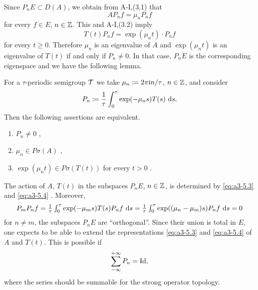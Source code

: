 Since $P_{n}E \subset D(A)$, we obtain from A-I,(3.1) that
\begin{equation}\label{eq:a3-5.3}
AP_{n}f = \mu_{n}P_{n}f
\end{equation}
for every $f \in E$, $n \in \mathbb{Z}$.
This and A-I,(3.2) imply
\begin{equation}\label{eq:a3-5.4}
T(t)P_{n}f = \exp(\mu_{n}t) \cdot P_{n}f
\end{equation}
for every $t \geq 0$.
Therefore $\mu_{n}$ is an eigenvalue of $A$ and $\exp(\mu_{n}t)$ is an eigenvalue of $T(t)$ if and only if $P_{n} \neq 0$.
In that case, $P_{n}E$ is the corresponding eigenspace and we have the following lemma.
\begin{lemma}\label{lem:a3-5.3}
For a $\tau$-periodic semigroup $\mathcal{T}$ we take $\mu_{n} \coloneqq 2\pi\mathrm{i} n/\tau$, $n \in \mathbb{Z}$, and consider
\[
P_{n} \coloneqq \frac{1}{\tau}\int_{0}^{\tau} \exp(-\mu_{n}s)T(s) \, \mathop{}\!\mathrm{d}{s} .
\]
Then the following assertions are equivalent.
\begin{enumerate}[\upshape (a)]
\item 
$P_{n} \neq 0$ ,

\item 
$\mu_{n} \in P\sigma(A)$ ,

\item 
$\exp(\mu_{n}t) \in P\sigma(T(t))$ for every $t > 0$ .

\end{enumerate}
\end{lemma}
The action of $A$, \resp $T(t)$ in the subspaces $P_{n}E$, $n \in \mathbb{Z}$, is determined by \eqref{eq:a3-5.3} and \eqref{eq:a3-5.4} \resp.
Moreover,
\[\textstyle
P_{m}P_{n}f =  \frac{1}{\tau}\int_{0}^{\tau} \exp(-\mu_{m}s)T(s)P_{n}f \, \mathop{}\!\mathrm{d}{s} 
=  \frac{1}{\tau}\int_{0}^{\tau} \exp((\mu_{n}-\mu_{m})s)P_{n}f \, \mathop{}\!\mathrm{d}{s} = 0
\]
for $n \neq m$, \ie the subspaces $P_{n}E$ are \enquote{orthogonal}.
Since their union is total in $E$, one expects to be able to extend the representations \eqref{eq:a3-5.3} and \eqref{eq:a3-5.4} of $A$ and $T(t)$.
This is possible if
\[
\sum_{-\infty}^{+\infty} P_{n} = \operatorname{Id} ,
\]
where the series should be summable for the strong operator topology.

